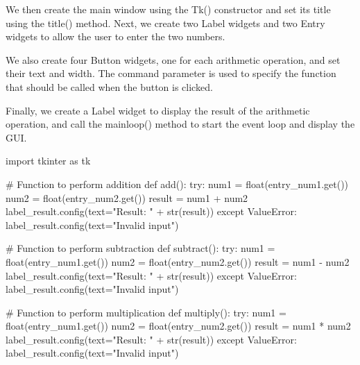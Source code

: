 \documentclass[
  letterpaper,
]{book}
\newenvironment{Shaded}{\begin{snugshade}}{\end{snugshade}}
\newcommand{\BuiltInTok}[1]{\textcolor[rgb]{0.00,0.23,0.31}{#1}}
\newcommand{\CommentTok}[1]{\textcolor[rgb]{0.37,0.37,0.37}{#1}}
\newcommand{\ControlFlowTok}[1]{\textcolor[rgb]{0.00,0.23,0.31}{#1}}
\newcommand{\ImportTok}[1]{\textcolor[rgb]{0.00,0.46,0.62}{#1}}
\newcommand{\KeywordTok}[1]{\textcolor[rgb]{0.00,0.23,0.31}{#1}}
\newcommand{\NormalTok}[1]{\textcolor[rgb]{0.00,0.23,0.31}{#1}}
\newcommand{\OperatorTok}[1]{\textcolor[rgb]{0.37,0.37,0.37}{#1}}
\newcommand{\PreprocessorTok}[1]{\textcolor[rgb]{0.68,0.00,0.00}{#1}}
\newcommand{\StringTok}[1]{\textcolor[rgb]{0.13,0.47,0.30}{#1}}
\begin{document}
We then create the main window using the Tk() constructor and set its
title using the title() method. Next, we create two Label widgets and
two Entry widgets to allow the user to enter the two numbers.

We also create four Button widgets, one for each arithmetic operation,
and set their text and width. The command parameter is used to specify
the function that should be called when the button is clicked.

Finally, we create a Label widget to display the result of the
arithmetic operation, and call the mainloop() method to start the event
loop and display the GUI.

\begin{Shaded}
\begin{Highlighting}[]
\ImportTok{import}\NormalTok{ tkinter }\ImportTok{as}\NormalTok{ tk}

\CommentTok{\# Function to perform addition}
\KeywordTok{def}\NormalTok{ add():}
    \ControlFlowTok{try}\NormalTok{:}
\NormalTok{        num1 }\OperatorTok{=} \BuiltInTok{float}\NormalTok{(entry\_num1.get())}
\NormalTok{        num2 }\OperatorTok{=} \BuiltInTok{float}\NormalTok{(entry\_num2.get())}
\NormalTok{        result }\OperatorTok{=}\NormalTok{ num1 }\OperatorTok{+}\NormalTok{ num2}
\NormalTok{        label\_result.config(text}\OperatorTok{=}\StringTok{"Result: "} \OperatorTok{+} \BuiltInTok{str}\NormalTok{(result))}
    \ControlFlowTok{except} \PreprocessorTok{ValueError}\NormalTok{:}
\NormalTok{        label\_result.config(text}\OperatorTok{=}\StringTok{"Invalid input"}\NormalTok{)}

\CommentTok{\# Function to perform subtraction}
\KeywordTok{def}\NormalTok{ subtract():}
    \ControlFlowTok{try}\NormalTok{:}
\NormalTok{        num1 }\OperatorTok{=} \BuiltInTok{float}\NormalTok{(entry\_num1.get())}
\NormalTok{        num2 }\OperatorTok{=} \BuiltInTok{float}\NormalTok{(entry\_num2.get())}
\NormalTok{        result }\OperatorTok{=}\NormalTok{ num1 }\OperatorTok{{-}}\NormalTok{ num2}
\NormalTok{        label\_result.config(text}\OperatorTok{=}\StringTok{"Result: "} \OperatorTok{+} \BuiltInTok{str}\NormalTok{(result))}
    \ControlFlowTok{except} \PreprocessorTok{ValueError}\NormalTok{:}
\NormalTok{        label\_result.config(text}\OperatorTok{=}\StringTok{"Invalid input"}\NormalTok{)}

\CommentTok{\# Function to perform multiplication}
\KeywordTok{def}\NormalTok{ multiply():}
    \ControlFlowTok{try}\NormalTok{:}
\NormalTok{        num1 }\OperatorTok{=} \BuiltInTok{float}\NormalTok{(entry\_num1.get())}
\NormalTok{        num2 }\OperatorTok{=} \BuiltInTok{float}\NormalTok{(entry\_num2.get())}
\NormalTok{        result }\OperatorTok{=}\NormalTok{ num1 }\OperatorTok{*}\NormalTok{ num2}
\NormalTok{        label\_result.config(text}\OperatorTok{=}\StringTok{"Result: "} \OperatorTok{+} \BuiltInTok{str}\NormalTok{(result))}
    \ControlFlowTok{except} \PreprocessorTok{ValueError}\NormalTok{:}
\NormalTok{        label\_result.config(text}\OperatorTok{=}\StringTok{"Invalid input"}\NormalTok{)}


\end{Highlighting}
\end{Shaded}
\end{document}
